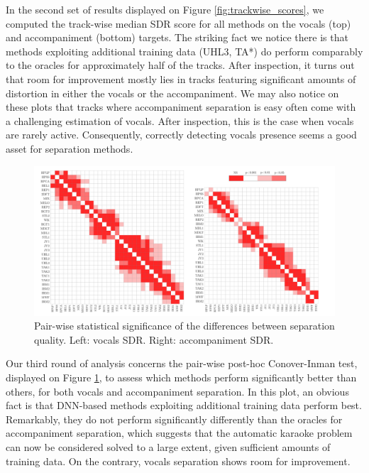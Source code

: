 \documentclass{llncs}
\begin{document}
In the second set of results displayed on Figure \ref{fig:trackwise_scores}, we computed the track-wise median SDR score for all methods on the vocals (top) and accompaniment (bottom) targets. The striking fact we notice there is that methods exploiting additional training data (UHL3, TA*) do perform comparably to the oracles for approximately half of the tracks. After inspection, it turns out that room for improvement mostly lies in tracks featuring significant amounts of distortion in either the vocals or the accompaniment. We may also notice on these plots that tracks where accompaniment separation is easy often come with a challenging estimation of vocals. After inspection, this is the case when vocals are rarely active. Consequently, correctly detecting vocals presence seems a good asset for separation methods.

\begin{figure}[h]
  \begin{center}
     \includegraphics[width=1\linewidth]{fig/pairwise.pdf}
     \vspace{-1cm}
  \end{center}
  \caption{Pair-wise statistical significance of the differences between separation quality. Left: vocals SDR. Right: accompaniment SDR.}
  \label{fig:pairwise_matrix}
\end{figure}

Our third round of analysis concerns the pair-wise post-hoc Conover-Inman test, displayed on Figure \ref{fig:pairwise_matrix}, to assess which methods perform significantly better than others, for both vocals and accompaniment separation. In this plot, an obvious fact is that DNN-based methods exploiting additional training data perform best. Remarkably, they do not perform significantly differently than the oracles for accompaniment separation, which suggests that the automatic karaoke problem can now be considered solved to a large extent, given sufficient amounts of training data. On the contrary, vocals separation shows room for improvement.
\end{document}
